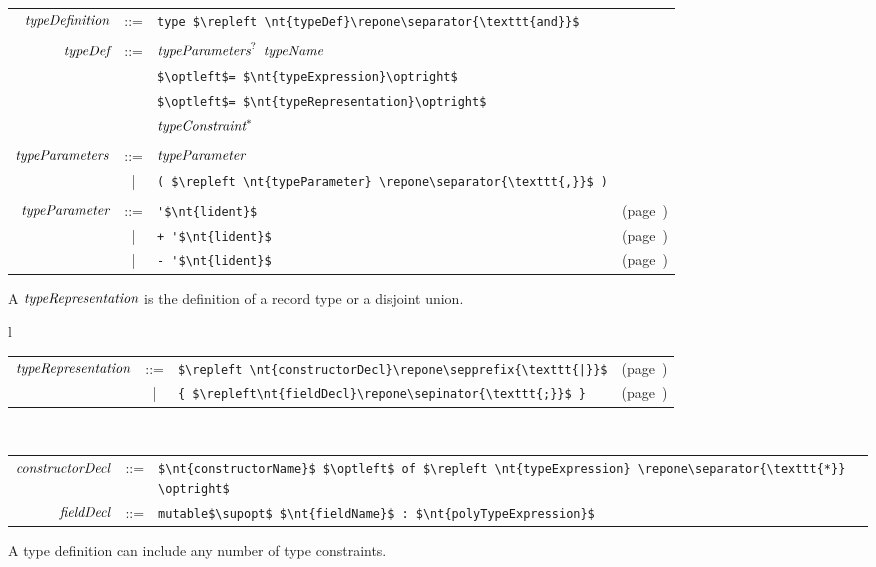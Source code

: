 \begin{center}
\begin{tabular}{rcll}
$\textit{\rmfamily typeDefinition}$ & ::= & \hbox{\lstinline/type $\repleft \nt{typeDef}\repone\separator{\texttt{and}}$/}\\
\\
$\textit{\rmfamily typeDef}$ & ::= & $\textit{\rmfamily typeParameters}^{?}$ $\textit{\rmfamily typeName}$\\
&   & \hbox{\lstinline/$\optleft$= $\nt{typeExpression}\optright$/}\\
&   & \hbox{\lstinline/$\optleft$= $\nt{typeRepresentation}\optright$/}\\
&   & $\textit{\rmfamily typeConstraint}^{*}$\\
\\
$\textit{\rmfamily typeParameters}$ & ::= & $\textit{\rmfamily typeParameter}$\\
& | & \hbox{\lstinline/( $\repleft \nt{typeParameter} \repone\separator{\texttt{,}}$ )/}\\
\\
$\textit{\rmfamily typeParameter}$ & ::= & \hbox{\lstinline/'$\nt{lident}$/} & (page~\pageref{keyword:'})\\
& | & \hbox{\lstinline/+ '$\nt{lident}$/} & (page~\pageref{section:variance-annotations})\\
& | & \hbox{\lstinline/- '$\nt{lident}$/} & (page~\pageref{section:variance-annotations})
\end{tabular}
\end{center}
%
A $\textit{\rmfamily typeRepresentation}$ is the definition of a record type or a disjoint union.

\begin{center}
\begin{tabular}{l}
\begin{tabular}{rcll}
$\textit{\rmfamily typeRepresentation}$ & ::= & \hbox{\lstinline/$\repleft \nt{constructorDecl}\repone\sepprefix{\texttt{|}}$/} & (page~\pageref{keyword:of})\\
& | & \hbox{\lstinline/{ $\repleft\nt{fieldDecl}\repone\sepinator{\texttt{;}}$ }/} & (page~\pageref{keyword:records})
\end{tabular}
\\
\begin{tabular}{rcl}
$\textit{\rmfamily constructorDecl}$ & ::= & \hbox{\lstinline/$\nt{constructorName}$ $\optleft$ of $\repleft \nt{typeExpression} \repone\separator{\texttt{*}} \optright$/}\\
$\textit{\rmfamily fieldDecl}$ & ::= & \hbox{\lstinline/mutable$\supopt$ $\nt{fieldName}$ : $\nt{polyTypeExpression}$/}
\end{tabular}
\end{tabular}
\end{center}
%
A type definition can include any number of type constraints.

